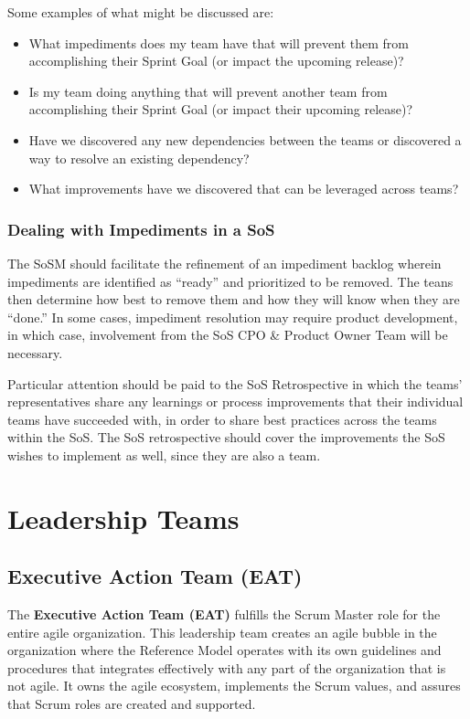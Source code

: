 \documentclass[12pt,a4paper,parskip=full]{scrartcl}
\begin{document}
Some examples of what might be discussed are:
\begin{itemize}
	\item What impediments does my team have that will prevent them from accomplishing their Sprint Goal (or impact the upcoming release)?
	\item Is my team doing anything that will prevent another team from accomplishing their Sprint Goal (or impact their upcoming release)?
	\item Have we discovered any new dependencies between the teams or discovered a way to resolve an existing dependency?
	\item What improvements have we discovered that can be leveraged across teams?
\end{itemize}

\subsubsection{Dealing with Impediments in a SoS}

The SoSM should facilitate the refinement of an impediment backlog wherein impediments are identified as ``ready'' and prioritized to be removed. The teans then determine how best to remove them and how they will know when they are ``done.'' In some cases, impediment resolution may require product development, in which case, involvement from the SoS CPO \& Product Owner Team will be necessary.

Particular attention should be paid to the SoS Retrospective in which the teams' representatives share any learnings or process improvements that their individual teams have succeeded with, in order to share best practices across the teams within the SoS. The SoS retrospective should cover the improvements the SoS wishes to implement as well, since they are also a team. 


\section{Leadership Teams}

\subsection{Executive Action Team (EAT)}

The \textbf{Executive Action Team (EAT)} fulfills the Scrum Master role for the entire agile organization. This leadership team creates an agile bubble in the organization where the Reference Model operates with its own guidelines and procedures that integrates effectively with any part of the organization that is not agile. It owns the agile ecosystem, implements the Scrum values, and assures that Scrum roles are created and supported.
\end{document}
